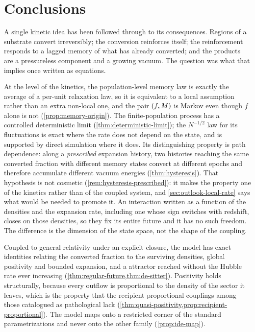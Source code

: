 \section{Conclusions}\label{sec:conclusions}

A single kinetic idea has been followed through to its consequences. Regions of
a substrate convert irreversibly; the conversion reinforces itself; the
reinforcement responds to a lagged memory of what has already converted; and
the products are a pressureless component and a growing vacuum. The question
was what that implies once written as equations.

At the level of the kinetics, the population-level memory law is exactly the average of a
per-unit relaxation law, so it is equivalent to a local assumption rather
than an extra non-local one, and the pair
$(f,M)$ is Markov even though $f$ alone is not
(\cref{prop:memory-origin}). The finite-population process has a controlled
deterministic limit (\cref{thm:deterministic-limit}); the $N^{-1/2}$ law for
its fluctuations is exact where the rate does not depend on the state, and is
supported by direct simulation where it does. Its distinguishing property is
path dependence: along a \emph{prescribed} expansion history, two histories
reaching the same converted fraction with different memory states convert at
different epochs and therefore accumulate different vacuum energies
(\cref{thm:hysteresis}). That hypothesis is not cosmetic
(\cref{rem:hysteresis-prescribed}): it makes the property one of the kinetics
rather than of the coupled system, and \cref{sec:outlook-local-rate} says what
would be needed to promote it. An
interaction written as a function of the densities and the expansion rate,
including one whose sign switches with redshift, closes on those densities, so
they fix its entire future and it has no such freedom. The difference is the
dimension of the state space, not the shape of the coupling.

Coupled to general relativity under an explicit closure, the model has exact
identities relating the converted fraction to the surviving densities, global
positivity and bounded expansion, and a \dS attractor reached without the
Hubble rate ever increasing (\cref{thm:regular-future,thm:de-sitter}).
Positivity holds structurally, because every outflow is proportional to the
density of the sector it leaves, which is the property that the
recipient-proportional couplings among those catalogued as pathological lack
(\cref{thm:quasi-positivity,prop:recipient-proportional}). The model maps onto a restricted corner of the
standard parametrizations and never onto the other family
(\cref{prop:ide-map}).

